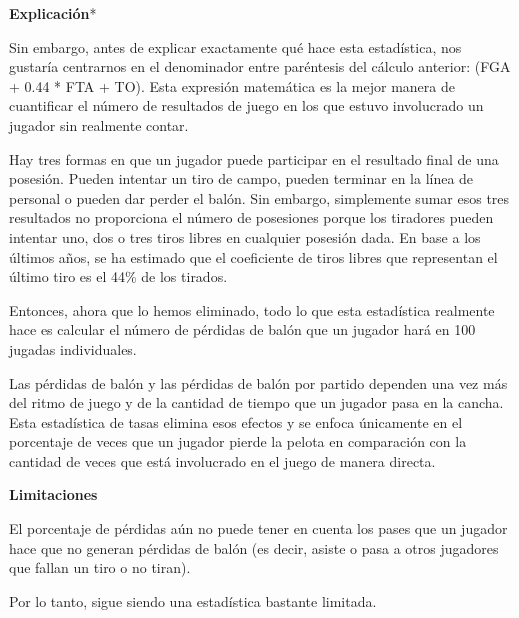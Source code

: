 \documentclass[
]{article}
\begin{document}
\textbf{Explicación}*

Sin embargo, antes de explicar exactamente qué hace esta estadística,
nos gustaría centrarnos en el denominador entre paréntesis del cálculo
anterior: (FGA + 0.44 * FTA + TO). Esta expresión matemática es la mejor
manera de cuantificar el número de resultados de juego en los que estuvo
involucrado un jugador sin realmente contar.

Hay tres formas en que un jugador puede participar en el resultado final
de una posesión. Pueden intentar un tiro de campo, pueden terminar en la
línea de personal o pueden dar perder el balón. Sin embargo, simplemente
sumar esos tres resultados no proporciona el número de posesiones porque
los tiradores pueden intentar uno, dos o tres tiros libres en cualquier
posesión dada. En base a los últimos años, se ha estimado que el
coeficiente de tiros libres que representan el último tiro es el 44\% de
los tirados.

Entonces, ahora que lo hemos eliminado, todo lo que esta estadística
realmente hace es calcular el número de pérdidas de balón que un jugador
hará en 100 jugadas individuales.

Las pérdidas de balón y las pérdidas de balón por partido dependen una
vez más del ritmo de juego y de la cantidad de tiempo que un jugador
pasa en la cancha. Esta estadística de tasas elimina esos efectos y se
enfoca únicamente en el porcentaje de veces que un jugador pierde la
pelota en comparación con la cantidad de veces que está involucrado en
el juego de manera directa.

\textbf{Limitaciones}

El porcentaje de pérdidas aún no puede tener en cuenta los pases que un
jugador hace que no generan pérdidas de balón (es decir, asiste o pasa a
otros jugadores que fallan un tiro o no tiran).

Por lo tanto, sigue siendo una estadística bastante limitada.
\end{document}
